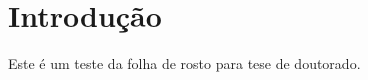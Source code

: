 \documentclass[doutorado]{UnB-PPGT}
\begin{document}
\maketitle

\textual

\chapter{Introdução}
Este é um teste da folha de rosto para tese de doutorado.
\end{document}
